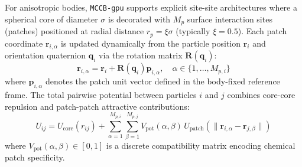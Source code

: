 \documentclass[final,5p,times,twocolumn]{elsarticle}
\begin{document}
For anisotropic bodies, \texttt{MCCB-gpu} supports explicit site-site architectures where a spherical core of diameter $\sigma$ is decorated with $M_p$ surface interaction sites (patches) positioned at radial distance $r_p = \xi \sigma$ (typically $\xi = 0.5$). Each patch coordinate $\mathbf{r}_{i,\alpha}$ is updated dynamically from the particle position $\mathbf{r}_i$ and orientation quaternion $\mathbf{q}_i$ via the rotation matrix $\mathbf{R}(\mathbf{q}_i)$:
\begin{equation}
    \mathbf{r}_{i,\alpha} = \mathbf{r}_i + \mathbf{R}(\mathbf{q}_i) \mathbf{p}_{i,\alpha}, \quad \alpha \in \{1, \dots, M_{p,i}\}
\end{equation}
where $\mathbf{p}_{i,\alpha}$ denotes the patch unit vector defined in the body-fixed reference frame. The total pairwise potential between particles $i$ and $j$ combines core-core repulsion and patch-patch attractive contributions:
\begin{equation}
    U_{ij} = U_{\text{core}}(r_{ij}) + \sum_{\alpha=1}^{M_{p,i}} \sum_{\beta=1}^{M_{p,j}} V_{\text{pot}}(\alpha, \beta) \, U_{\text{patch}}(\|\mathbf{r}_{i,\alpha} - \mathbf{r}_{j,\beta}\|)
    \label{eq:patchy_total}
\end{equation}
where $V_{\text{pot}}(\alpha, \beta) \in [0, 1]$ is a discrete compatibility matrix encoding chemical patch specificity.
\end{document}
